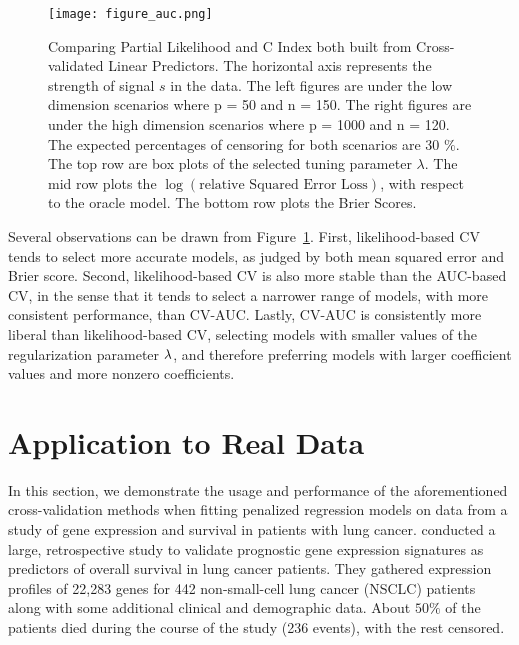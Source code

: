 \begin{figure}[!htb]
  \centering
  \texttt{[image: figure\_auc.png]}
  \caption{\label{Fig:cvauc}Comparing Partial Likelihood and C Index both built from Cross-validated Linear Predictors. The horizontal axis represents the strength of signal $s$ in the data. The left figures are under the low dimension scenarios where p = 50 and n = 150. The right figures are under the high dimension scenarios where p = 1000 and n = 120. The expected percentages of censoring for both scenarios are 30 $\%$. The top row are box plots of the selected tuning parameter $\lambda$. The mid row plots the $\log(\text{relative Squared Error Loss})$, with respect to the oracle model. The bottom row plots the Brier Scores. }
\end{figure}

\afterpage{\clearpage}

Several observations can be drawn from Figure~\ref{Fig:cvauc}. First, likelihood-based CV tends to select more accurate models, as judged by both mean squared error and Brier score.  Second, likelihood-based CV is also more stable than the AUC-based CV, in the sense that it tends to select a narrower range of models, with more consistent performance, than CV-AUC.  Lastly, CV-AUC is consistently more liberal than likelihood-based CV, selecting models with smaller values of the regularization parameter $\lambda$, and therefore preferring models with larger coefficient values and more nonzero coefficients.

\section{Application to Real Data}

In this section, we demonstrate the usage and performance of the aforementioned cross-validation methods when fitting penalized regression models on data from a study of gene expression and survival in patients with lung cancer. \citet{shedden2008gene} conducted a large, retrospective study to validate prognostic gene expression signatures as predictors of overall survival in lung cancer patients. They gathered expression profiles of 22,283 genes for 442 non-small-cell lung cancer (NSCLC) patients along with some additional clinical and demographic data. About $50\%$ of the patients died during the course of the study (236 events), with the rest censored. 

